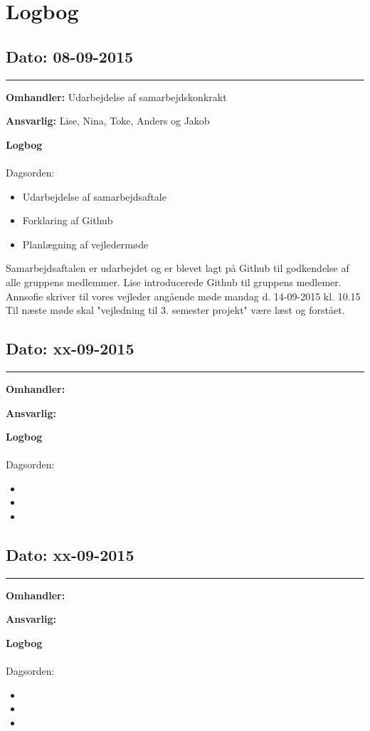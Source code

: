 \chapter{Logbog}

\section{Dato: 08-09-2015 }
\hrule

\textbf{Omhandler:} Udarbejdelse af samarbejdskonkrakt 

\textbf{Ansvarlig:} Lise, Nina, Toke, Anders og Jakob

\textbf{Logbog}
\\
\\
Dagsorden:
\begin{itemize}
	\item Udarbejdelse af samarbejdsaftale
	\item Forklaring af Github
	\item Planlægning af vejledermøde
\end{itemize}

Samarbejdsaftalen er udarbejdet og er blevet lagt på Github til godkendelse af alle gruppens medlemmer.\newline 
Lise introducerede Github til gruppens medlemer.\newline 
Annsofie skriver til vores vejleder angående møde mandag d. 14-09-2015 kl. 10.15\newline 
Til næste møde skal "vejledning til 3. semester projekt" være læst og forstået.\newline





\section{Dato: xx-09-2015 }
\hrule

\textbf{Omhandler:}  

\textbf{Ansvarlig:} 

\textbf{Logbog}
\\
\\
Dagsorden:
\begin{itemize}
	\item 
	\item 
	\item 
\end{itemize}





\section{Dato: xx-09-2015 }
\hrule

\textbf{Omhandler:}  

\textbf{Ansvarlig:} 

\textbf{Logbog}
\\
\\
Dagsorden:
\begin{itemize}
	\item 
	\item 
	\item 
\end{itemize}
